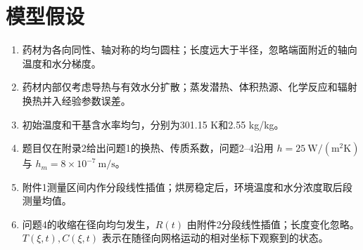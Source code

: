 \documentclass[12pt,a4paper]{ctexart}
\begin{document}
\section{模型假设}
\begin{enumerate}
  \item 药材为各向同性、轴对称的均匀圆柱；长度远大于半径，忽略端面附近的轴向温度和水分梯度。
  \item 药材内部仅考虑导热与有效水分扩散；蒸发潜热、体积热源、化学反应和辐射换热并入经验参数误差。
  \item 初始温度和干基含水率均匀，分别为301.15 K和2.55 kg/kg。
  \item 题目仅在附录2给出问题1的换热、传质系数，问题2--4沿用 $h=25\ \mathrm{W/(m^2K)}$ 与 $h_m=8\times10^{-7}\ \mathrm{m/s}$。
  \item 附件1测量区间内作分段线性插值；烘房稳定后，环境温度和水分浓度取后段测量均值。
  \item 问题4的收缩在径向均匀发生，$R(t)$ 由附件2分段线性插值；长度变化忽略。$T(\xi,t),C(\xi,t)$ 表示在随径向网格运动的相对坐标下观察到的状态。
\end{enumerate}
\end{document}
